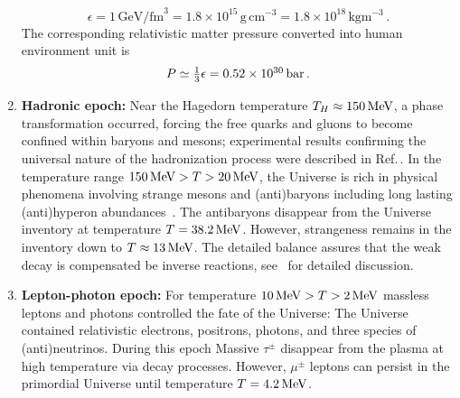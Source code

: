 \begin{enumerate}
\begin{equation}
\epsilon=1\,\mathrm{GeV/fm}^3
= 1.8\times 10^{15}\,\mathrm{g\,cm^{-3}} 
=1.8\times 10^{18}\,\mathrm{kg m^{-3}}\,.
\end{equation}
The corresponding relativistic matter pressure converted into human environment unit is
\begin{equation} \label{presval}
P\simeq \textstyle\frac{1}{3} \epsilon=0.52\times 10^{30} \,\mathrm{bar}\,.
\end{equation}
%
\item \textbf{Hadronic epoch:} Near the Hagedorn temperature $T_H\approx 150\text{\,MeV}$, a phase transformation occurred, forcing the free quarks and gluons to become confined within baryons and mesons; experimental results confirming the universal nature of the hadronization process were described in Ref.\,\cite{Letessier:2005qe}. In the temperature range $ 150\text{\,MeV} >T>20\text{\,MeV}$, the Universe is rich in physical phenomena involving strange mesons and (anti)baryons including long lasting (anti)hyperon abundances~\cite{Fromerth:2012fe,Yang:2021bko}. The antibaryons disappear from the Universe inventory at temperature $T=38.2\text{\,MeV}$. However, strangeness remains in the inventory down to $T\approx13\text{\,MeV}$. The detailed balance assures that the weak decay is compensated be inverse reactions, see~ for detailed discussion.
%
\item \textbf{Lepton-photon epoch:} For temperature $10\text{\,MeV} >T>2\text{\,MeV}$ massless leptons and photons controlled the fate of the Universe: The Universe contained relativistic electrons, positrons, photons, and three species of (anti)neutrinos. During this epoch Massive $\tau^\pm$ disappear from the plasma at high temperature via decay processes. However, $\mu^\pm$ leptons can persist in the primordial Universe until temperature $T=4.2\text{\,MeV}$.


\end{enumerate}
